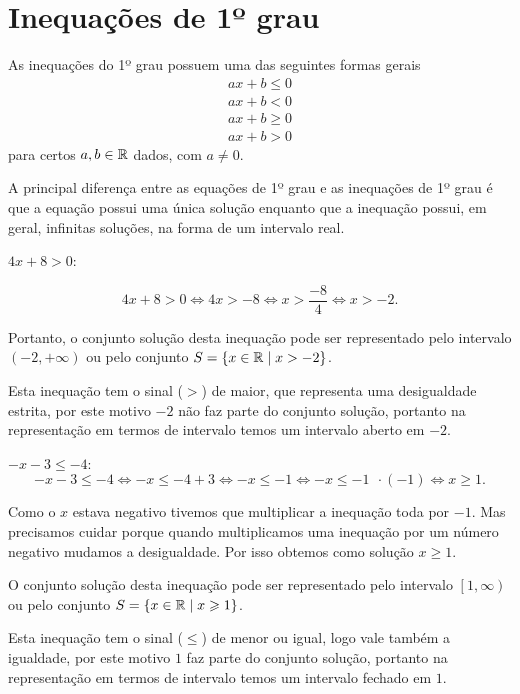  \section{Inequações de 1º grau}
 
\begin{obs}
  As inequações do 1º grau possuem uma das seguintes formas gerais
 \begin{eqnarray*}
 ax+b \leq 0 \\
 ax+b < 0 \\
 ax+b \geqslant 0 \\
 ax+b >0 
 \end{eqnarray*}  
 para certos $a, b \in \mathbb{R}$ dados, com $a \neq 0$.
\end{obs}
  
 A principal diferença entre as equações de 1º grau e as inequações de 1º grau é que a equação possui uma única solução enquanto que a inequação possui, em geral, infinitas soluções, na forma de um intervalo real.
 
 \begin{exem} 
 $4x + 8 > 0$:
 
\begin{equation*}
4x + 8 > 0 \Leftrightarrow 4x > -8 \Leftrightarrow x > \frac{-8}{4} \Leftrightarrow x > -2.
\end{equation*}
 
 Portanto, o conjunto solução desta inequação pode ser representado pelo intervalo $\left(-2, +\infty \right)$ ou pelo conjunto $S=\{x \in \mathbb{R} \mid x > -2\}$. 
 
 Esta inequação tem o sinal ($>$) de maior, que representa uma desigualdade estrita, por este motivo $-2$ não faz parte do conjunto solução, portanto na representação em termos de intervalo temos um intervalo aberto em $-2$.
 \end{exem}
 
 \begin{exem} 
 $-x-3 \leq -4$:
\begin{equation*}
-x-3 \leq -4 \Leftrightarrow -x \leq -4 + 3 \Leftrightarrow -x \leq -1 \Leftrightarrow -x \leq -1 \ \ \cdot (-1) \Leftrightarrow x \geqslant 1.
\end{equation*}
 
 Como o $x$ estava negativo tivemos que multiplicar a inequação toda por $-1$. Mas precisamos cuidar porque quando multiplicamos uma inequação por um número negativo mudamos a desigualdade. Por isso obtemos como solução $x \geqslant 1$.
 
  O conjunto solução desta inequação pode ser representado pelo intervalo $\left[1, \infty \right)$ ou pelo conjunto $S=\{x \in \mathbb{R} \mid x \geqslant 1\}$. 
  
  Esta inequação tem o sinal ($\leq$) de menor ou igual, logo vale também a igualdade, por este motivo $1$ faz parte do conjunto solução, portanto na representação em termos de intervalo temos um intervalo fechado em $1$.
 \end{exem}
 
